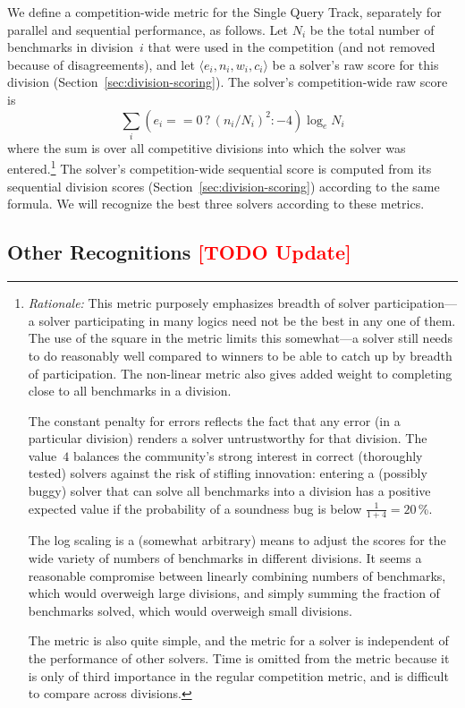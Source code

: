 \documentclass[12pt]{article}
\newcommand{\rem}[1]{\textcolor{red}{[#1]}}
\newcommand{\todo}[1]{\rem{TODO #1}}
\newcommand{\main}{Single Query\xspace}
\begin{document}
We define a competition-wide metric for the \main Track, separately for
parallel and sequential performance, as follows.  Let $N_i$ be the
total number of benchmarks in division~$i$ that were used in the
competition (and not removed because of disagreements), and let
$\langle e_i, n_i, w_i, c_i\rangle$ be a solver's raw score for this
division (Section~\ref{sec:division-scoring}).  The solver's
competition-wide raw score is
%
$$\sum_i (e_i == 0 \,?\, (n_i/N_i)^2 : -4) \log_e N_i$$
%
where the sum is over all competitive divisions into which the solver
was entered.\footnote{\emph{Rationale:} This metric purposely
  emphasizes breadth of solver participation---a solver participating
  in many logics need not be the best in any one of them.  The use of
  the square in the metric limits this somewhat---a solver still needs
  to do reasonably well compared to winners to be able to catch up by
  breadth of participation.  The non-linear metric also gives added
  weight to completing close to all benchmarks in a division.

  The constant penalty for errors reflects the fact that any error (in
  a particular division) renders a solver untrustworthy for that
  division.  The value~$4$ balances the community's strong interest in
  correct (thoroughly tested) solvers against the risk of stifling
  innovation: entering a (possibly buggy) solver that can solve all
  benchmarks into a division has a positive expected value if the
  probability of a soundness bug is below $\frac{1}{1+4} = 20$\,\%.
  
  The log scaling is a (somewhat arbitrary) means to adjust the scores
  for the wide variety of numbers of benchmarks in different
  divisions.  It seems a reasonable compromise between linearly
  combining numbers of benchmarks, which would overweigh large
  divisions, and simply summing the fraction of benchmarks solved,
  which would overweigh small divisions.

  The metric is also quite simple, and the metric for a solver is
  independent of the performance of other solvers.  Time is omitted
  from the metric because it is only of third importance in the
  regular competition metric, and is difficult to compare across
  divisions.}  The solver's competition-wide sequential score is
computed from its sequential division scores
(Section~\ref{sec:division-scoring}) according to the same formula.
We will recognize the best three solvers according to these metrics.

\subsection{Other Recognitions \todo{Update}}
\end{document}
